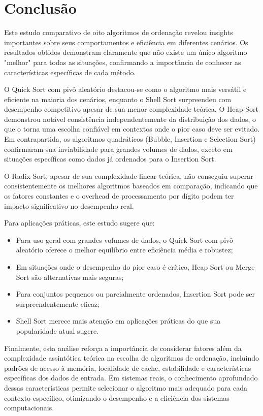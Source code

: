 \documentclass[a4paper, 12pt]{article}
\begin{document}
    \section{Conclusão}
    Este estudo comparativo de oito algoritmos de ordenação revelou insights importantes sobre seus comportamentos e eficiência em diferentes cenários. Os resultados obtidos demonstram claramente que não existe um único algoritmo "melhor" para todas as situações, confirmando a importância de conhecer as características específicas de cada método.

    O Quick Sort com pivô aleatório destacou-se como o algoritmo mais versátil e eficiente na maioria dos cenários, enquanto o Shell Sort surpreendeu com desempenho competitivo apesar de sua menor complexidade teórica. O Heap Sort demonstrou notável consistência independentemente da distribuição dos dados, o que o torna uma escolha confiável em contextos onde o pior caso deve ser evitado. Em contrapartida, os algoritmos quadráticos (Bubble, Insertion e Selection Sort) confirmaram sua inviabilidade para grandes volumes de dados, exceto em situações específicas como dados já ordenados para o Insertion Sort.

    O Radix Sort, apesar de sua complexidade linear teórica, não conseguiu superar consistentemente os melhores algoritmos baseados em comparação, indicando que os fatores constantes e o overhead de processamento por dígito podem ter impacto significativo no desempenho real.

    Para aplicações práticas, este estudo sugere que:
    \begin{itemize}
        \item Para uso geral com grandes volumes de dados, o Quick Sort com pivô aleatório oferece o melhor equilíbrio entre eficiência média e robustez;
        \item Em situações onde o desempenho do pior caso é crítico, Heap Sort ou Merge Sort são alternativas mais seguras;
        \item Para conjuntos pequenos ou parcialmente ordenados, Insertion Sort pode ser surpreendentemente eficaz;
        \item Shell Sort merece mais atenção em aplicações práticas do que sua popularidade atual sugere.
    \end{itemize}

    Finalmente, esta análise reforça a importância de considerar fatores além da complexidade assintótica teórica na escolha de algoritmos de ordenação, incluindo padrões de acesso à memória, localidade de cache, estabilidade e características específicas dos dados de entrada. Em sistemas reais, o conhecimento aprofundado dessas características permite selecionar o algoritmo mais adequado para cada contexto específico, otimizando o desempenho e a eficiência dos sistemas computacionais.
\end{document}
